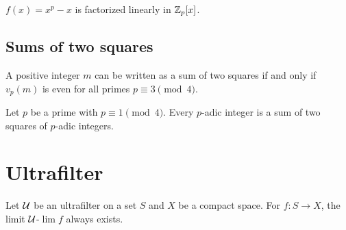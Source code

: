 \documentclass[11pt]{article}
\let\realsection\section
\renewcommand\section{\newpage\realsection}
\begin{document}
\begin{ex}
$f(x)=x^p-x$ is factorized linearly in $\mathbb{Z}_p[x]$.
\end{ex}

\subsection{Sums of two squares}


\begin{thm}[Euler]
A positive integer $m$ can be written as a sum of two squares if and only if $v_p(m)$ is even for all primes $p\equiv3\pmod4$.
\end{thm}
\begin{lem}
Let $p$ be a prime with $p\equiv1\pmod4$.
Every $p$-adic integer is a sum of two squares of $p$-adic integers.
\end{lem}











\section{Ultrafilter}

\begin{thm}
Let $\mathcal{U}$ be an ultrafilter on a set $S$ and $X$ be a compact space.
For $f\colon S\to X$, the limit $\mathcal{U}$-$\lim f$ always exists.
\end{thm}
\end{document}
